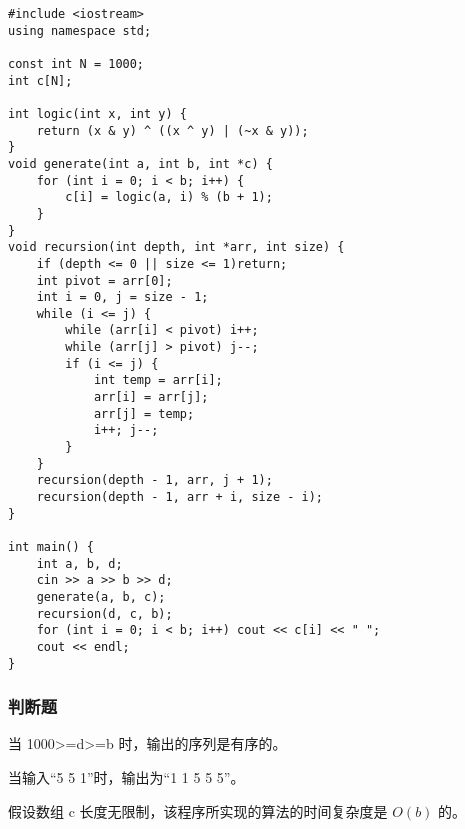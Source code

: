 \documentclass{exam-zh}
\newcommand{\true}{\paren[$\checkmark$]}
\newcommand{\false}{\paren[$\times$]}
\begin{document}
\begin{lstlisting}
#include <iostream>
using namespace std;

const int N = 1000;
int c[N];

int logic(int x, int y) {
    return (x & y) ^ ((x ^ y) | (~x & y));
}
void generate(int a, int b, int *c) {
    for (int i = 0; i < b; i++) {
        c[i] = logic(a, i) % (b + 1);
    }
}
void recursion(int depth, int *arr, int size) {
    if (depth <= 0 || size <= 1)return;
    int pivot = arr[0];
    int i = 0, j = size - 1;
    while (i <= j) {
        while (arr[i] < pivot) i++;
        while (arr[j] > pivot) j--;
        if (i <= j) {
            int temp = arr[i];
            arr[i] = arr[j];
            arr[j] = temp;
            i++; j--;
        }
    }
    recursion(depth - 1, arr, j + 1);
    recursion(depth - 1, arr + i, size - i);
}

int main() {
    int a, b, d;
    cin >> a >> b >> d;
    generate(a, b, c);
    recursion(d, c, b);
    for (int i = 0; i < b; i++) cout << c[i] << " ";
    cout << endl;
}
\end{lstlisting}
     
    \begin{solution}
     
    \end{solution}

    \subsubsection{判断题}
    
    \begin{question}
        当 1000>=d>=b 时，输出的序列是有序的。\true
    \end{question}
    
    \begin{solution}

    \end{solution}

    \begin{question}
        当输入“5 5 1”时，输出为“1 1 5 5 5”。\false
    \end{question}
    
    \begin{solution}
        
    \end{solution}

    \begin{question}
        假设数组 c 长度无限制，该程序所实现的算法的时间复杂度是 $O(b)$ 的。\false
    \end{question}
    
\end{document}
